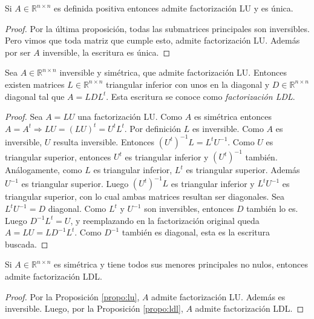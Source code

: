 \begin{coro}
Si $A \in \mathbb{R}^{n \times n}$ es definida positiva entonces admite factorización LU y es única.
\begin{proof}
Por la última proposición, todas las submatrices principales son inversibles. Pero vimos que toda matriz que cumple esto, admite factorización LU. Además por ser $A$ inversible, la escritura es única.
\end{proof}
\end{coro}

\begin{propo}
\label{propo:ldl}
Sea $A \in \mathbb{R}^{n \times n}$ inversible y simétrica, que admite factorización LU. Entonces existen matrices $L \in \mathbb{R}^{n \times n}$ triangular inferior con unos en la diagonal y $D \in \mathbb{R}^{n \times n}$ diagonal tal que $A = LDL^t$. Esta escritura se conoce como \textit{factorización LDL}.

\begin{proof}
Sea $A = LU$ una factorización LU. Como $A$ es simétrica entonces $A = A^t \Rightarrow LU = (LU)^t = U^t L^t$. Por definición $L$ es inversible. Como $A$ es inversible, $U$ resulta inversible. Entonces $(U^t)^{-1}L = L^t U^{-1}$. Como $U$ es triangular superior, entonces $U^t$ es triangular inferior y $(U^t)^{-1}$ también. Análogamente, como $L$ es triangular inferior, $L^t$ es triangular superior. Además $U^{-1}$ es triangular superior. Luego $(U^t)^{-1}L$ es triangular inferior y $L^t U^{-1}$ es triangular superior, con lo cual ambas matrices resultan ser diagonales. Sea $L^t U^{-1} = D$ diagonal. Como $L^t$ y $U^{-1}$ son inversibles, entonces $D$ también lo es. Luego $D^{-1}L^t = U$, y reemplazando en la factorización original queda $A = LU = LD^{-1}L^t$. Como $D^{-1}$ también es diagonal, esta es la escritura buscada.
\end{proof}
\end{propo}

\begin{coro}
\label{coro:ldl}
Si $A \in \mathbb{R}^{n \times n}$ es simétrica y tiene todos sus menores principales no nulos, entonces admite factorización LDL.

\begin{proof}
Por la Proposición \ref{propo:lu}, $A$ admite factorización LU. Además es inversible. Luego, por la Proposición \ref{propo:ldl}, $A$ admite factorización LDL.
\end{proof}
\end{coro}


